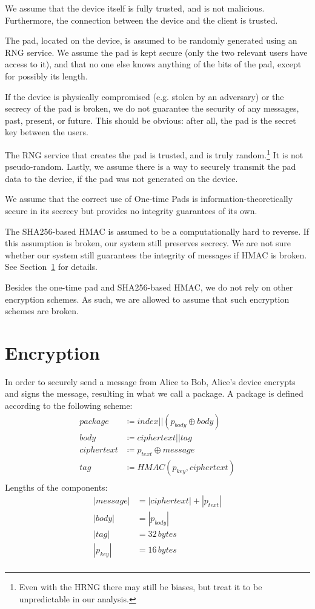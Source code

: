 \documentclass[twocolumn]{article}
\begin{document}
We assume that the device itself is fully trusted, and is not malicious. Furthermore, the connection between the device and the client is trusted.

The pad, located on the device, is assumed to be randomly generated using an RNG service. We assume the pad is kept secure (only the two relevant users have access to it), and that no one else knows anything of the bits of the pad, except for possibly its length. 

If the device is physically compromised (e.g. stolen by an adversary) or the secrecy of the pad is broken, we do not guarantee the security of any messages, past, present, or future. This should be obvious: after all, the pad is the secret key between the users.

The RNG service that creates the pad is trusted, and is truly random.\footnote{
Even with the HRNG there may still be biases, but treat it to be unpredictable in our analysis.
}
It is not pseudo-random. Lastly, we assume there is a way to securely transmit the pad data to the device, if the pad was not generated on the device.

We assume that the correct use of One-time Pads is information-theoretically secure in its secrecy but provides no integrity guarantees of its own.

The SHA256-based HMAC is assumed to be a computationally hard to reverse. If this assumption is broken, our system still preserves secrecy. We are not sure whether our system still guarantees the integrity of messages if HMAC is broken. See Section~\ref{sec:encryption} for details.

Besides the one-time pad and SHA256-based HMAC, we do not rely on other encryption schemes. As such, we are allowed to assume that such encryption schemes are broken.


\section{Encryption}
\label{sec:encryption}

In order to securely send a message from Alice to Bob, Alice's device encrypts and signs the message, resulting in what we call a package. A package is defined according to the following scheme:
\begin{align*}
package &\coloneqq index || (p_{body} \oplus body) \\
body &\coloneqq ciphertext || tag \\
ciphertext &\coloneqq p_{text} \oplus message \\
tag &\coloneqq HMAC(p_{key},ciphertext) \\
\end{align*}
Lengths of the components:
\begin{align*}
|message| &= |ciphertext|+|p_{text}|\\
|body| &= |p_{body}| \\
|tag| &= 32\, bytes \\
|p_{key}| &= 16\, bytes \\
\end{align*}
\end{document}
